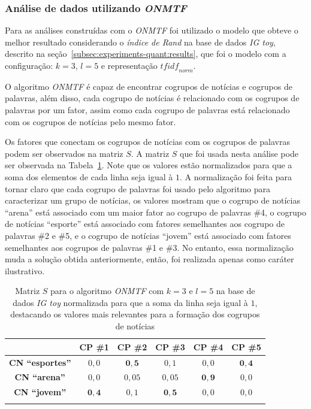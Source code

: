 \documentclass[
    12pt,                %
    oneside,            %
    a4paper,            %
    english,            %
    brazil                %
    ]{abntex2ppgsi}
\begin{document}
\subsubsection{Análise de dados utilizando \textit{ONMTF}}

Para as análises construídas com o \textit{ONMTF} foi utilizado o modelo que obteve o melhor resultado considerando o \textit{índice de Rand} na base de dados \textit{IG toy},  descrito na seção~\ref{subsec:experiments-quant:results}, que foi o modelo com a configuração: $k = 3$, $l = 5$ e representação $\textit{tfidf}_{norm}$.

O algoritmo \textit{ONMTF} é capaz de encontrar cogrupos de notícias e cogrupos de palavras, além disso, cada cogrupo de notícias é relacionado com os cogrupos de palavras por um fator, assim como cada cogrupo de palavras está relacionado com os cogrupos de notícias pelo mesmo fator.

Os fatores que conectam os cogrupos de notícias com os cogrupos de palavras podem ser observados na matriz $S$.
A matriz $S$ que foi usada nesta análise pode ser observada na Tabela~\ref{tab:onmtf:matrizS}.
Note que os valores estão normalizados para que a soma dos elementos de cada linha seja igual à $1$.
A normalização foi feita para tornar claro que cada cogrupo de palavras foi usado pelo algoritmo para caracterizar um grupo de notícias, os valores mostram que o cogrupo de notícias ``arena'' está associado com um maior fator ao cogrupo de palavras \#4, o cogrupo de notícias ``esporte'' está associado com fatores semelhantes aos cogrupo de palavras \#2 e \#5, e o cogrupo de notícias ``jovem'' está associado com fatores semelhantes aos cogrupos de palavras \#1 e \#3.
No entanto, essa normalização muda a solução obtida anteriormente, então, foi realizada apenas como caráter ilustrativo.

\begin{table}[H]
    \centering
    \caption{Matriz $S$ para o algoritmo \textit{ONMTF} com $k = 3$ e $l = 5$ na base de dados \textit{IG toy} normalizada para que a soma da linha seja igual à $1$, destacando os valores mais relevantes para a formação dos cogrupos de notícias}
    \begin{tabular}{cccccc}
        \hline
         & \textbf{CP \#1} & \textbf{CP \#2} & \textbf{CP \#3} & \textbf{CP \#4} & \textbf{CP \#5} \\
        \hline
        \textbf{CN ``esportes''} & $0,0$ & $\mathbf{0,5}$  & $0,1$  & $0,0$ & $\mathbf{0,4}$ \\
        \textbf{CN ``arena''}    & $0,0$ & $0,05$ & $0,05$ & $\mathbf{0,9}$ & $0,0$ \\
        \textbf{CN ``jovem''}    & $\mathbf{0,4}$ & $0,1$  & $\mathbf{0,5}$  & $0,0$ & $0,0$ \\
        \hline \\
    \end{tabular}
    \label{tab:onmtf:matrizS}
\end{table}
\end{document}
